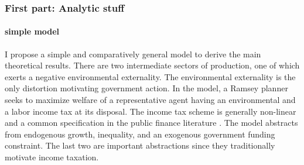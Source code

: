 \begin{comment}
When labor supply is fixed, environmental taxes alone can establish the efficient allocation in a representative agent economy absent fiscal distortions. Then, such a tax instrument is optimally set to the social cost of an externality, and originators internalize these social costs: the Pigou principle.
However, not redistributing environmental tax revenues reduces consumption below the efficient level and, as I demonstrate, the optimal environmental tax does not follow the Pigou principle.  If, on top, the  labor supply decision is endogenous, the environmental tax alone features too high labor supply. \tr{This results in too high environmental externality. \textbf{To be shown!}}

Lump-sum transfers of environmental tax revenues restore the efficient allocation: as households become richer, labor supply reduces. When lump-sum transfers are not available, the government can establish the efficient allocation by redistributing environmental tax revenues through an income tax scheme which I demonstrate to be progressive.

content...
\end{comment}

\subsubsection*{First part: Analytic stuff}
\paragraph{simple model}
I propose a simple and comparatively general model to derive the main theoretical results. There are two intermediate sectors of production, one of which exerts a negative environmental externality. The environmental externality is the only distortion motivating government action. In the model, a Ramsey planner seeks to maximize welfare of a representative agent having  an environmental and a labor income tax at its disposal. The income tax scheme is generally non-linear and a common specification in the public finance literature \citep[e.g.][]{Benabou2002TaxEfficiency, Heathcote2017OptimalFramework}.
The model abstracts from  endogenous growth, inequality, and an exogenous government funding constraint. The last two are important abstractions since they traditionally motivate income taxation.

